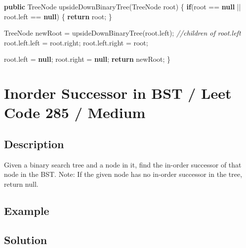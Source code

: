 \documentclass[]{book}
\newenvironment{Shaded}{\begin{snugshade}}{\end{snugshade}}
\newcommand{\BuiltInTok}[1]{#1}
\newcommand{\CommentTok}[1]{\textcolor[rgb]{0.56,0.35,0.01}{\textit{#1}}}
\newcommand{\FunctionTok}[1]{\textcolor[rgb]{0.00,0.00,0.00}{#1}}
\newcommand{\KeywordTok}[1]{\textcolor[rgb]{0.13,0.29,0.53}{\textbf{#1}}}
\newcommand{\NormalTok}[1]{#1}
\begin{document}
\begin{Shaded}
\begin{Highlighting}[]
\KeywordTok{public} \BuiltInTok{TreeNode} \FunctionTok{upsideDownBinaryTree}\NormalTok{(}\BuiltInTok{TreeNode}\NormalTok{ root) \{}
    \KeywordTok{if}\NormalTok{(root == }\KeywordTok{null}\NormalTok{ || root.}\FunctionTok{left}\NormalTok{ == }\KeywordTok{null}\NormalTok{) \{}
        \KeywordTok{return}\NormalTok{ root;}
\NormalTok{    \}}

    \BuiltInTok{TreeNode}\NormalTok{ newRoot = }\FunctionTok{upsideDownBinaryTree}\NormalTok{(root.}\FunctionTok{left}\NormalTok{);}
    \CommentTok{//children of root.left}
\NormalTok{    root.}\FunctionTok{left}\NormalTok{.}\FunctionTok{left}\NormalTok{ = root.}\FunctionTok{right}\NormalTok{;}
\NormalTok{    root.}\FunctionTok{left}\NormalTok{.}\FunctionTok{right}\NormalTok{ = root;}

\NormalTok{    root.}\FunctionTok{left}\NormalTok{ = }\KeywordTok{null}\NormalTok{;}
\NormalTok{    root.}\FunctionTok{right}\NormalTok{ = }\KeywordTok{null}\NormalTok{;}
    \KeywordTok{return}\NormalTok{ newRoot;}
\NormalTok{\}}
\end{Highlighting}
\end{Shaded}

\hypertarget{inorder-successor-in-bst-leet-code-285-medium}{%
\section{Inorder Successor in BST / Leet Code 285 / Medium}\label{inorder-successor-in-bst-leet-code-285-medium}}

\hypertarget{description-70}{%
\subsection{Description}\label{description-70}}

Given a binary search tree and a node in it, find the in-order successor of that node in the BST.
Note: If the given node has no in-order successor in the tree, return null.

\hypertarget{example-67}{%
\subsection{Example}\label{example-67}}

\hypertarget{solution-47}{%
\subsection{Solution}\label{solution-47}}
\end{document}
